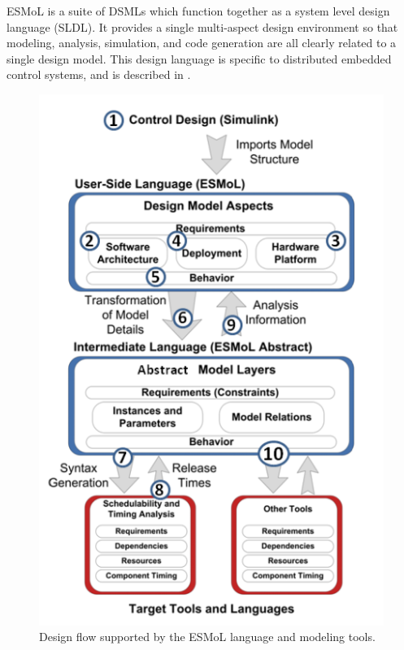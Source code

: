 \documentclass[10pt, conference, compsocconf]{IEEEtran}
\begin{document}
ESMoL is a suite of DSMLs which function together as a system level design language (SLDL). It provides a single multi-aspect design environment so that modeling, analysis, simulation, and code generation are all clearly related to a single design model. This design language is specific to distributed embedded control systems, and is described in \cite{modeling:esmol}.

\begin{figure}[!t]
\centering
\includegraphics[width=\columnwidth]{figures/designflow.png}
\caption{Design flow supported by the ESMoL language and modeling tools.}
\label{fig:designflow}
\end{figure}
\end{document}
